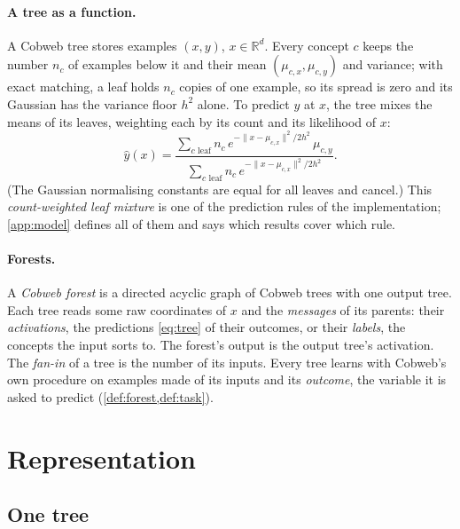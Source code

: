 \documentclass[11pt]{article}
\theoremstyle{definition}
\theoremstyle{remark}
\newcommand{\R}{\mathbb{R}}
\newcommand{\hy}{\hat{y}}
\begin{document}
\paragraph{A tree as a function.}
A Cobweb tree stores examples $(x,y)$, $x\in\R^d$.  Every concept $c$ keeps the number
$n_c$ of examples below it and their mean $(\mu_{c,x},\mu_{c,y})$ and variance; with exact
matching, a leaf holds $n_c$ copies of one example, so its spread is zero and its Gaussian
has the variance floor $h^2$ alone.  To predict $y$ at $x$, the tree mixes the means of its
leaves, weighting each by its count and its likelihood of $x$:
\begin{equation}\label{eq:tree}
  \hy(x)=\frac{\sum_{c\text{ leaf}}n_c\,e^{-\|x-\mu_{c,x}\|^2/2h^2}\,\mu_{c,y}}
              {\sum_{c\text{ leaf}}n_c\,e^{-\|x-\mu_{c,x}\|^2/2h^2}}.
\end{equation}
(The Gaussian normalising constants are equal for all leaves and cancel.)  This
\emph{count-weighted leaf mixture} is one of the prediction rules of the implementation;
\cref{app:model} defines all of them and says which results cover which rule.

\paragraph{Forests.}
A \emph{Cobweb forest} is a directed acyclic graph of Cobweb trees with one output tree.
Each tree reads some raw coordinates of $x$ and the \emph{messages} of its parents: their
\emph{activations}, the predictions \eqref{eq:tree} of their outcomes, or their
\emph{labels}, the concepts the input sorts to.  The forest's output is the output tree's
activation.  The \emph{fan-in} of a tree is the number of its inputs.  Every tree learns
with Cobweb's own procedure on examples made of its inputs and its \emph{outcome}, the
variable it is asked to predict (\cref{def:forest,def:task}).

\section{Representation}\label{sec:repr-main}

\subsection{One tree}
\end{document}
